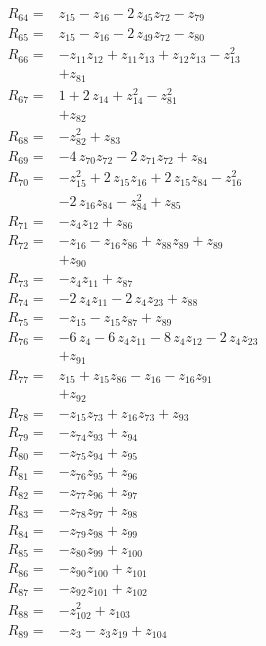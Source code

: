 \begin{align*}
R_{64}={}&z_{15} -z_{16} -2\,z_{45}z_{72} -z_{79}\\[2pt]
R_{65}={}&z_{15} -z_{16} -2\,z_{49}z_{72} -z_{80}\\[2pt]
R_{66}={}&-z_{11}z_{12} +z_{11}z_{13} +z_{12}z_{13} -z_{13}^{2}\\
&+z_{81}\\[2pt]
R_{67}={}&1 +2\,z_{14} +z_{14}^{2} -z_{81}^{2}\\
&+z_{82}\\[2pt]
R_{68}={}&-z_{82}^{2} +z_{83}\\[2pt]
R_{69}={}&-4\,z_{70}z_{72} -2\,z_{71}z_{72} +z_{84}\\[2pt]
R_{70}={}&-z_{15}^{2} +2\,z_{15}z_{16} +2\,z_{15}z_{84} -z_{16}^{2}\\
&-2\,z_{16}z_{84} -z_{84}^{2} +z_{85}\\[2pt]
R_{71}={}&-z_{4}z_{12} +z_{86}\\[2pt]
R_{72}={}&-z_{16} -z_{16}z_{86} +z_{88}z_{89} +z_{89}\\
&+z_{90}\\[2pt]
R_{73}={}&-z_{4}z_{11} +z_{87}\\[2pt]
R_{74}={}&-2\,z_{4}z_{11} -2\,z_{4}z_{23} +z_{88}\\[2pt]
R_{75}={}&-z_{15} -z_{15}z_{87} +z_{89}\\[2pt]
R_{76}={}&-6\,z_{4} -6\,z_{4}z_{11} -8\,z_{4}z_{12} -2\,z_{4}z_{23}\\
&+z_{91}\\[2pt]
R_{77}={}&z_{15} +z_{15}z_{86} -z_{16} -z_{16}z_{91}\\
&+z_{92}\\[2pt]
R_{78}={}&-z_{15}z_{73} +z_{16}z_{73} +z_{93}\\[2pt]
R_{79}={}&-z_{74}z_{93} +z_{94}\\[2pt]
R_{80}={}&-z_{75}z_{94} +z_{95}\\[2pt]
R_{81}={}&-z_{76}z_{95} +z_{96}\\[2pt]
R_{82}={}&-z_{77}z_{96} +z_{97}\\[2pt]
R_{83}={}&-z_{78}z_{97} +z_{98}\\[2pt]
R_{84}={}&-z_{79}z_{98} +z_{99}\\[2pt]
R_{85}={}&-z_{80}z_{99} +z_{100}\\[2pt]
R_{86}={}&-z_{90}z_{100} +z_{101}\\[2pt]
R_{87}={}&-z_{92}z_{101} +z_{102}\\[2pt]
R_{88}={}&-z_{102}^{2} +z_{103}\\[2pt]
R_{89}={}&-z_{3} -z_{3}z_{19} +z_{104}\\[2pt]

\end{align*}

